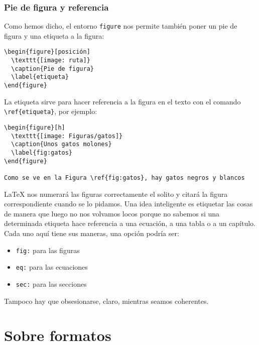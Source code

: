 \subsubsection{Pie de figura y referencia}\label{sec:caption}

Como hemos dicho, el entorno \lstinline!figure! nos permite también
poner un pie de figura y una etiqueta a la figura:

\begin{lstlisting}[language={[latex]tex}]
\begin{figure}[posición]
  \texttt{[image: ruta]}
  \caption{Pie de figura}
  \label{etiqueta}
\end{figure}
\end{lstlisting}

La etiqueta sirve para hacer referencia a la figura en el texto con el
comando \lstinline!\ref{etiqueta}!, por ejemplo:

\begin{lstlisting}[language={[latex]tex}]
\begin{figure}[h]
  \texttt{[image: Figuras/gatos]}
  \caption{Unos gatos molones}
  \label{fig:gatos}
\end{figure}

Como se ve en la Figura \ref{fig:gatos}, hay gatos negros y blancos
\end{lstlisting}

LaTeX nos numerará las figuras correctamente el solito y citará la
figura correspondiente cuando se lo pidamos. Una idea inteligente es
etiquetar las cosas de manera que luego no nos volvamos locos porque no
sabemos si una determinada etiqueta hace referencia a una ecuación, a
una tabla o a un capítulo. Cada uno aquí tiene sus maneras, una opción
podría ser:

\begin{itemize}
\item
  \lstinline!fig:! para las figuras
\item
  \lstinline!eq:! para las ecuaciones
\item
  \lstinline!sec:! para las secciones
\end{itemize}

Tampoco hay que obsesionarse, claro, mientras seamos coherentes.

\section{Sobre formatos}\label{sec:formatos}

